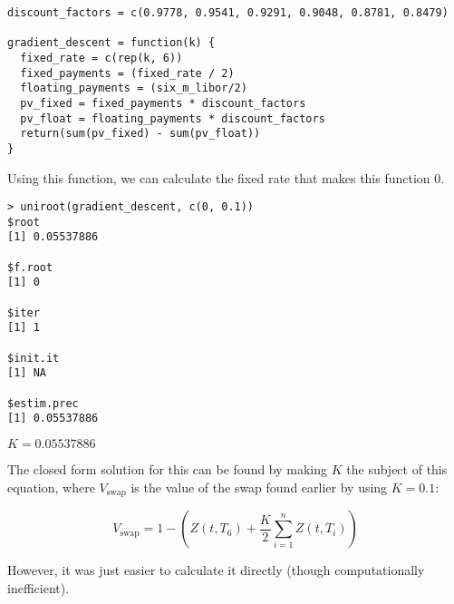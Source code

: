\documentclass[11pt]{scrartcl}
\begin{document}
\begin{lstlisting}
discount_factors = c(0.9778, 0.9541, 0.9291, 0.9048, 0.8781, 0.8479)

gradient_descent = function(k) {
  fixed_rate = c(rep(k, 6))
  fixed_payments = (fixed_rate / 2)
  floating_payments = (six_m_libor/2)
  pv_fixed = fixed_payments * discount_factors
  pv_float = floating_payments * discount_factors
  return(sum(pv_fixed) - sum(pv_float))
}
\end{lstlisting}

Using this function, we can calculate the fixed rate that makes this function 0.

\begin{lstlisting}
> uniroot(gradient_descent, c(0, 0.1))
$root
[1] 0.05537886

$f.root
[1] 0

$iter
[1] 1

$init.it
[1] NA

$estim.prec
[1] 0.05537886
\end{lstlisting}

$K = 0.05537886$

The closed form solution for this can be found by making $K$ the subject of this equation, where $V_\mathrm{swap}$ is the value of the swap found earlier by using $K=0.1$:

\[V_\mathrm{swap} = 1 - \left(Z(t, T_6) + \frac{K}{2}\sum_{i=1}^nZ(t, T_i) \right)\]

However, it was just easier to calculate it directly (though computationally inefficient).
\end{document}
